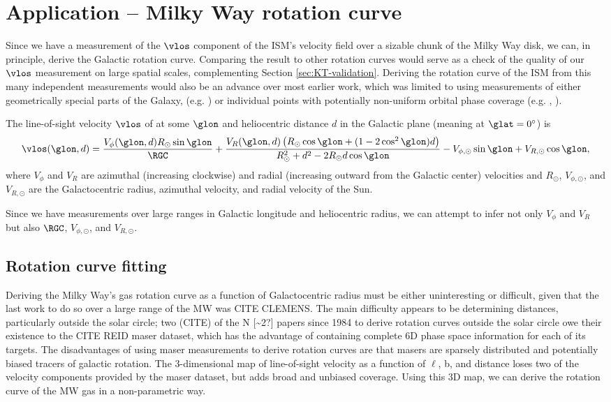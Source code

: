 \section{Application -- Milky Way rotation curve}
\label{sec:rotation_curve}

Since we have a measurement of the $\vlos$ component of the ISM's velocity field over a sizable chunk of the Milky Way disk, we can, in principle, derive the Galactic rotation curve.
Comparing the result to other rotation curves would serve as a check of the quality of our $\vlos$ measurement on large spatial scales, complementing Section \ref{sec:KT-validation}.
Deriving the rotation curve of the ISM from this many independent measurements would also be an advance over most earlier work, which was limited to using measurements of either geometrically special parts of the Galaxy, (e.g. \Clemens) or individual points with potentially non-uniform orbital phase coverage (e.g. \citealt{Reid:2009jb}, \Reid). 

The line-of-sight velocity $\vlos$ of at some $\glon$ and heliocentric distance $d$ in the Galactic plane (meaning at $\glat=0^\circ$) is 
\begin{equation}
\label{eqn:vlos_complete}
\vlos(\glon, d) = \frac{V_\phi (\glon, d) R_\odot \sin\glon}{\RGC} + 
\frac{V_R (\glon, d) \left(R_\odot \cos \glon + (1 - 2 \cos^2 \glon) d  \right) }{R^2_\odot + d^2 - 2 R_\odot d \cos \glon} - V_{\phi, \odot} \sin \glon + V_{R, \odot} \cos \glon,
\end{equation}
where $V_\phi$ and $V_R$ are azimuthal (increasing clockwise) and radial (increasing outward from the Galactic center) velocities and $R_\odot$, $V_{\phi, \odot}$, and $V_{R, \odot}$ are the Galactocentric radius, azimuthal velocity, and radial velocity of the Sun. 

Since we have measurements over large ranges in Galactic longitude and heliocentric radius, we can attempt to infer not only $V_\phi$ and $V_R$ but also $\RGC$, $V_{\phi, \odot}$, and $V_{R, \odot}$.

\subsection{Rotation curve fitting}

Deriving the Milky Way's gas rotation curve as a function of Galactocentric radius must be either uninteresting or difficult, given that the last work to do so over a large range of the MW was CITE CLEMENS. The main difficulty appears to be determining distances, particularly outside the solar circle; two (CITE) of the N [\sim 2?] papers since 1984 to derive rotation curves outside the solar circle owe their existence to the CITE REID maser dataset, which has the advantage of containing complete 6D phase space information for each of its targets. The disadvantages of using maser measurements to derive rotation curves are that masers are sparsely distributed and potentially biased tracers of galactic rotation. The 3-dimensional map of line-of-sight velocity as a function of $\ell$, b, and distance loses two of the velocity components provided by the maser dataset, but adds broad and unbiased coverage. Using this 3D map, we can derive the rotation curve of the MW gas in a non-parametric way.

